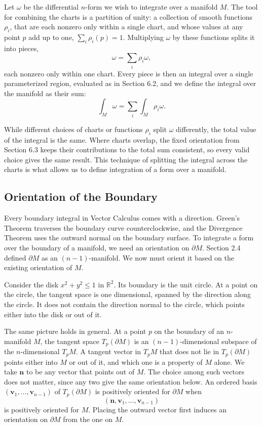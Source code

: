 \documentclass[12pt]{article}
\newcommand{\R}{\mathbb{R}}
\newcommand{\p}{\partial}
\newcommand{\bv}[1]{\mathbf{#1}}
\begin{document}
Let $\omega$ be the differential $n$-form we wish to integrate over a manifold $M$. The tool for combining the charts is a partition of unity: a collection of smooth functions $\rho_i$, that are each nonzero only within a single chart, and whose values at any point $p$ add up to one, $\sum_i \rho_i(p) = 1$. Multiplying $\omega$ by these functions splits it into pieces,
\[
\omega = \sum_i \rho_i \omega,
\]
each nonzero only within one chart. Every piece is then an integral over a single parameterized region, evaluated as in Section 6.2, and we define the integral over the manifold as their sum:
\[
\int_M \omega = \sum_i \int_M \rho_i \omega.
\]

While different choices of charts or functions $\rho_i$ split $\omega$ differently, the total value of the integral is the same. Where charts overlap, the fixed orientation from Section 6.3 keeps their contributions to the total sum consistent, so every valid choice gives the same result. This technique of splitting the integral across the charts is what allows us to define integration of a form over a manifold.

\subsection{Orientation of the Boundary}

Every boundary integral in Vector Calculus comes with a direction. Green's Theorem traverses the boundary curve counterclockwise, and the Divergence Theorem uses the outward normal on the boundary surface. To integrate a form over the boundary of a manifold, we need an orientation on $\p M$. Section 2.4 defined $\p M$ as an $(n-1)$-manifold. We now must orient it based on the existing orientation of $M$.

Consider the disk $x^2 + y^2 \le 1$ in $\R^2$. Its boundary is the unit circle. At a point on the circle, the tangent space is one dimensional, spanned by the direction along the circle. It does not contain the direction normal to the circle, which points either into the disk or out of it.

The same picture holds in general. At a point $p$ on the boundary of an $n$-manifold $M$, the tangent space $T_p(\p M)$ is an $(n-1)$-dimensional subspace of the $n$-dimensional $T_pM$. A tangent vector in $T_pM$ that does not lie in $T_p(\p M)$ points either into $M$ or out of it, and which one is a property of $M$ alone. We take $\bv{n}$ to be any vector that points out of $M$. The choice among such vectors does not matter, since any two give the same orientation below. An ordered basis $(\bv{v}_1, \dots, \bv{v}_{n-1})$ of $T_p(\p M)$ is positively oriented for $\p M$ when
\[
(\bv{n}, \bv{v}_1, \dots, \bv{v}_{n-1})
\]
is positively oriented for $M$. Placing the outward vector first induces an orientation on $\p M$ from the one on $M$.
\end{document}
